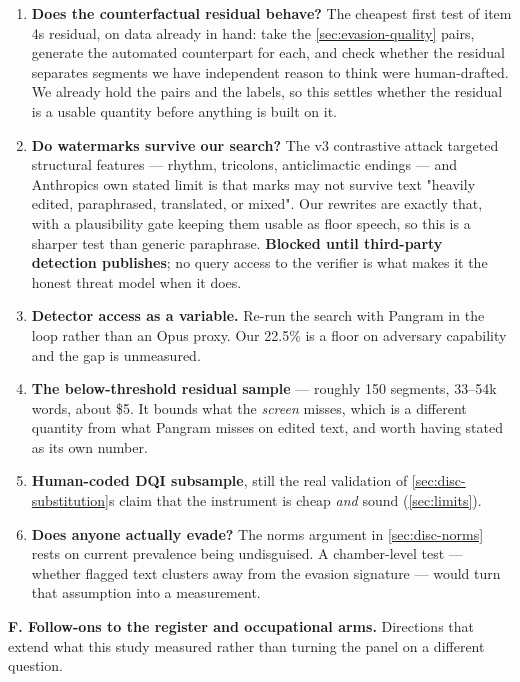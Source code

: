 \begin{enumerate}
\def\labelenumi{\arabic{enumi}.}
\setcounter{enumi}{20}
\tightlist
\item
  \textbf{Does the counterfactual residual behave?} The cheapest first test of item
  4\textquotesingle s residual, on data already in hand: take the \cref{sec:evasion-quality} pairs, generate the
  automated counterpart for each, and check whether the residual separates
  segments we have independent reason to think were human-drafted. We already
  hold the pairs and the labels, so this settles whether the residual is a
  usable quantity before anything is built on it.
\item
  \textbf{Do watermarks survive our search?} The v3 contrastive attack targeted
  structural features --- rhythm, tricolons, anticlimactic endings --- and
  Anthropic\textquotesingle s own stated limit is that marks may not survive text "heavily
  edited, paraphrased, translated, or mixed". Our rewrites are exactly that,
  with a plausibility gate keeping them usable as floor speech, so this is a
  sharper test than generic paraphrase. \textbf{Blocked until third-party detection
  publishes}; no query access to the verifier is what makes it the honest
  threat model when it does.
\item
  \textbf{Detector access as a variable.} Re-run the search with Pangram in the
  loop rather than an Opus proxy. Our 22.5\% is a floor on adversary
  capability and the gap is unmeasured.
\item
  \textbf{The below-threshold residual sample} --- roughly 150 segments, 33--54k
  words, about \$5. It bounds what the \emph{screen} misses, which is a different
  quantity from what Pangram misses on edited text, and worth having stated
  as its own number.
\item
  \textbf{Human-coded DQI subsample}, still the real validation of \cref{sec:disc-substitution}\textquotesingle s claim
  that the instrument is cheap \emph{and} sound (\cref{sec:limits}).
\item
  \textbf{Does anyone actually evade?} The norms argument in \cref{sec:disc-norms} rests on current
  prevalence being undisguised. A chamber-level test --- whether flagged text
  clusters away from the evasion signature --- would turn that assumption into
  a measurement.
\end{enumerate}

\textbf{F. Follow-ons to the register and occupational arms.} Directions that
extend what this study measured rather than turning the panel on a different
question.

